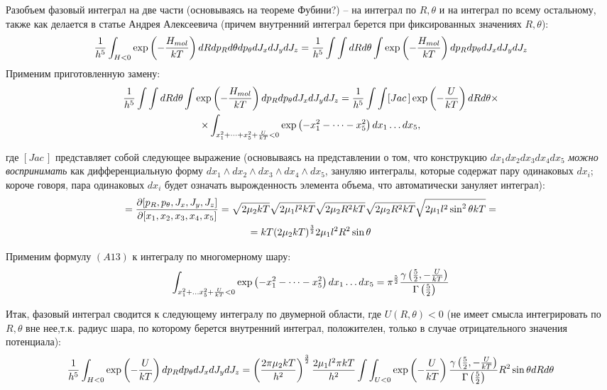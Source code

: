 \documentclass[14pt]{article}
\newcommand{\lb}{\left(}
\newcommand{\rb}{\right)}
\begin{document}
Разобъем фазовый интеграл на две части (основываясь на теореме Фубини?) -- на интеграл по $R, \theta$ и на интеграл по всему остальному, также как делается в статье Андрея Алексеевича (причем внутренний интеграл берется при фиксированных значениях $R, \theta$):
\begin{gather}
	\frac{1}{h^5} \int_{H < 0} \exp \lb -\frac{H_{mol}}{kT} \rb dR dp_R d\theta dp_\theta dJ_x dJ_y dJ_z = \frac{1}{h^5} \int \int dR d\theta \int \exp \lb -\frac{H_{mol}}{kT} \rb dp_R dp_\theta dJ_x dJ_y dJ_z \notag	
\end{gather}
Применим приготовленную замену:
\begin{gather}
	\frac{1}{h^5} \int \int dR d\theta \int \exp \lb -\frac{H_{mol}}{kT} \rb dp_R dp_\theta dJ_x dJ_y dJ_z = \frac{1}{h^5} \int \int [Jac \, ] \exp \lb -\frac{U}{kT} \rb dR d\theta \times \notag \\ \times \int_{x_1^2 + \dots + x_5^2 + \frac{U}{kT} < 0} \exp \lb - x_1^2 - \dots - x_5^2 \rb dx_1 \dots dx_5, \notag 
\end{gather}

где $[Jac \,]$ представляет собой следующее выражение (основываясь на представлении о том, что конструкцию $dx_1 dx_2 dx_3 dx_4 dx_5$ \textit{можно воспринимать} как дифференциальную форму $dx_1 \wedge dx_2 \wedge dx_3 \wedge dx_4 \wedge dx_5$, зануляю интегралы, которые содержат пару одинаковых $dx_i$; короче говоря, пара одинаковых $dx_i$ будет означать вырожденность элемента объема, что автоматически зануляет интеграл):
\begin{gather}
	[Jac\,] = \frac{\partial [p_R, p_\theta, J_x, J_y, J_z]}{\partial [x_1, x_2, x_3, x_4, x_5]} = \sqrt{2 \mu_2 k T} \sqrt{2 \mu_1 l^2 k T} \sqrt{2 \mu_2 R^2 kT} \sqrt{2 \mu_2 R^2 kT} \sqrt{2 \mu_1 l^2 \sin^2 \theta kT} = \notag \\
	= kT (2 \mu_2 kT)^\frac{3}{2} 2\mu_1 l^2 R^2 \sin \theta \notag
\end{gather}

Применим формулу $(A13)$ к интегралу по многомерному шару:
\begin{gather}
	\int_{x_1^2 + \dots x_5^2 + \frac{U}{kT} < 0} \exp \lb -x_1^2 - \dots -x_5^2 \rb dx_1 \dots dx_5 = \pi^\frac{5}{2} \frac{\gamma \lb \frac{5}{2}, - \frac{U}{kT} \rb}{\Gamma \lb \frac{5}{2} \rb} \notag
\end{gather}

Итак, фазовый интеграл сводится к следующему интегралу по двумерной области, где $U(R, \theta) < 0$ (не имеет смысла интегрировать по $R, \theta$ вне нее,т.к. радиус шара, по которому берется внутренний интеграл, положителен, только в случае отрицательного значения потенциала):
\begin{gather}
	\frac{1}{h^5} \int_{H < 0} \exp \lb -\frac{U}{kT} \rb dp_R dp_\theta dJ_x dJ_y dJ_z = \lb \frac{2 \pi \mu_2 k T}{h^2} \rb^{\frac{3}{2}} \frac{2 \mu_1 l^2 \pi k T}{h^2} \int \int_{U < 0} \exp \lb -\frac{U}{kT}\rb \frac{\gamma \lb \frac{5}{2}, - \frac{U}{kT} \rb}{\Gamma \lb \frac{5}{2} \rb} R^2 \sin \theta dR d\theta \notag 
\end{gather}
\end{document}
